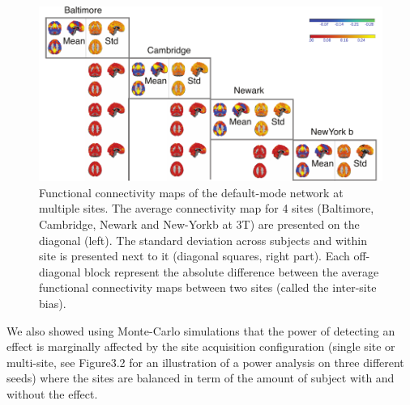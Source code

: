 \begin{figure}[H]
\begin{center}
\includegraphics[width=\linewidth]{../figures/mult_center_dm_voxel_seed_3tonly.pdf}
\end{center}
\caption[DMN variability across sites]{
Functional connectivity maps of the default-mode network at multiple sites. The average connectivity map for 4 sites (Baltimore, Cambridge, Newark and New-Yorkb at 3T) are presented on the diagonal (left). The standard deviation across subjects and within site is presented next to it (diagonal squares, right part). Each off-diagonal block represent the absolute difference between the average functional connectivity maps between two sites (called the inter-site bias).
}
\label{fig_DMN_variability}
\end{figure}

We also showed using Monte-Carlo simulations that the power of detecting an effect is marginally affected by the site acquisition configuration (single site or multi-site, see Figure3.2 for an illustration of a power analysis on three different seeds) where the sites are balanced in term of the amount of subject with and without the effect. 

